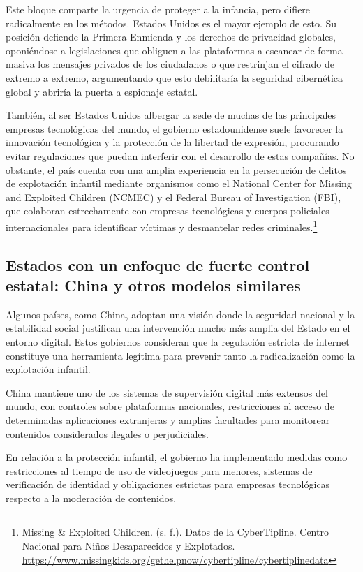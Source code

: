 Este bloque comparte la urgencia de proteger a la infancia, pero difiere radicalmente en los métodos. Estados Unidos es el mayor ejemplo de esto. Su posición defiende la Primera Enmienda y los derechos de privacidad globales, oponiéndose a legislaciones que obliguen a las plataformas a escanear de forma masiva los mensajes privados de los ciudadanos o que restrinjan el cifrado de extremo a extremo, argumentando que esto debilitaría la seguridad cibernética global y abriría la puerta a espionaje estatal.

También, al ser Estados Unidos albergar la sede de muchas de las principales empresas tecnológicas del mundo, el gobierno estadounidense suele favorecer la innovación tecnológica y la protección de la libertad de expresión, procurando evitar regulaciones que puedan interferir con el desarrollo de estas compañías. No obstante, el país cuenta con una amplia experiencia en la persecución de delitos de explotación infantil mediante organismos como el National Center for Missing and Exploited Children (NCMEC) y el Federal Bureau of Investigation (FBI), que colaboran estrechamente con empresas tecnológicas y cuerpos policiales internacionales para identificar víctimas y desmantelar redes criminales.\footnote{Missing \& Exploited Children. (s. f.). Datos de la CyberTipline. Centro Nacional para Niños Desaparecidos y Explotados. \url{https://www.missingkids.org/gethelpnow/cybertipline/cybertiplinedata}}

\subsection{Estados con un enfoque de fuerte control estatal: China y otros modelos similares}

Algunos países, como China, adoptan una visión donde la seguridad nacional y la estabilidad social justifican una intervención mucho más amplia del Estado en el entorno digital. Estos gobiernos consideran que la regulación estricta de internet constituye una herramienta legítima para prevenir tanto la radicalización como la explotación infantil.

China mantiene uno de los sistemas de supervisión digital más extensos del mundo, con controles sobre plataformas nacionales, restricciones al acceso de determinadas aplicaciones extranjeras y amplias facultades para monitorear contenidos considerados ilegales o perjudiciales.

En relación a la protección infantil, el gobierno ha implementado medidas como restricciones al tiempo de uso de videojuegos para menores, sistemas de verificación de identidad y obligaciones estrictas para empresas tecnológicas respecto a la moderación de contenidos.

